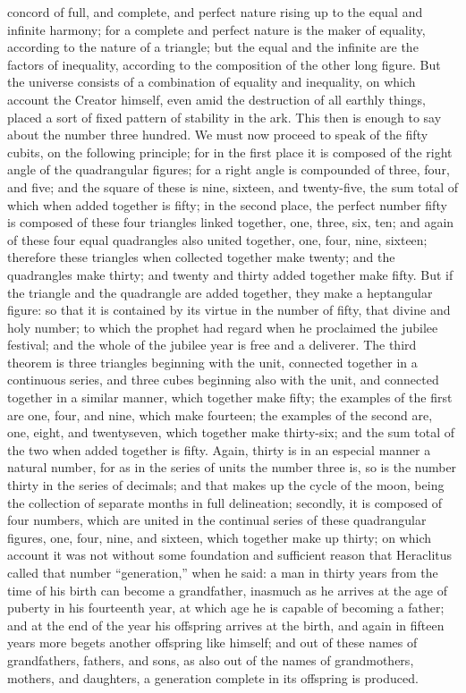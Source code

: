 concord of full, and complete, and perfect nature rising up to the equal and infinite harmony; for a
complete and perfect nature is the maker of equality, according to the nature of a triangle; but the
equal and the infinite are the factors of inequality, according to the composition of the other long
figure. But the universe consists of a combination of equality and inequality, on which account the
Creator himself, even amid the destruction of all earthly things, placed a sort of fixed pattern of
stability in the ark. This then is enough to say about the number three hundred. We must now
proceed to speak of the fifty cubits, on the following principle; for in the first place it is composed of
the right angle of the quadrangular figures; for a right angle is compounded of three, four, and five;
and the square of these is nine, sixteen, and twenty-five, the sum total of which when added
together is fifty; in the second place, the perfect number fifty is composed of these four triangles
linked together, one, three, six, ten; and again of these four equal quadrangles also united
together, one, four, nine, sixteen; therefore these triangles when collected together make twenty;
and the quadrangles make thirty; and twenty and thirty added together make fifty. But if the triangle
and the quadrangle are added together, they make a heptangular figure: so that it is contained by
its virtue in the number of fifty, that divine and holy number; to which the prophet had regard when
he proclaimed the jubilee festival; and the whole of the jubilee year is free and a deliverer. The third
theorem is three triangles beginning with the unit, connected together in a continuous series, and
three cubes beginning also with the unit, and connected together in a similar manner, which
together make fifty; the examples of the first are one, four, and nine, which make fourteen; the
examples of the second are, one, eight, and twentyseven, which together make thirty-six; and the
sum total of the two when added together is fifty. Again, thirty is in an especial manner a natural
number, for as in the series of units the number three is, so is the number thirty in the series of
decimals; and that makes up the cycle of the moon, being the collection of separate months in full
delineation; secondly, it is composed of four numbers, which are united in the continual series of
these quadrangular figures, one, four, nine, and sixteen, which together make up thirty; on which
account it was not without some foundation and sufficient reason that Heraclitus called that number
``generation,'' when he said: a man in thirty years from the time of his birth can become a
grandfather, inasmuch as he arrives at the age of puberty in his fourteenth year, at which age he is
capable of becoming a father; and at the end of the year his offspring arrives at the birth, and
again in fifteen years more begets another offspring like himself; and out of these names of
grandfathers, fathers, and sons, as also out of the names of grandmothers, mothers, and
daughters, a generation complete in its offspring is produced.

